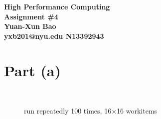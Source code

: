 \documentclass[12pt]{article}
\begin{document}
\begin{center}

\large \textbf{%
High Performance Computing \\ Assignment \#4 \\ Yuan-Xun Bao \\ yxb201@nyu.edu \quad N13392943}
\end{center}

\section{Part (a)}

\begin{figure}[h]
\centering
{} \\
\caption{run repeatedly 100 times, 16$\times$16 workitems}
\end{figure}
\end{document}
